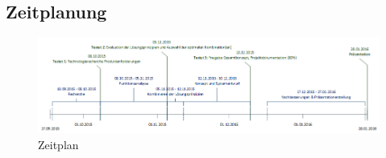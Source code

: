 \subsection{Zeitplanung}
\begin{figure}[H]%
\centering
\includegraphics[width=1.0\textwidth]{04_Projektmanagement/fig/zeitplan.png}
\caption{Zeitplan}
\label{fig:zeitplan}
\end{figure}

